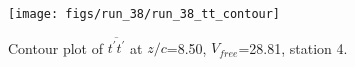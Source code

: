 \begin{figure}[H]
\centering
\texttt{[image: figs/run\_38/run\_38\_tt\_contour]}
\caption{Contour plot of $\overline{t^\prime t^\prime}$ at $z/c$=8.50, $V_{free}$=28.81, station 4.}
\label{fig:run_38_tt_contour}
\end{figure}


